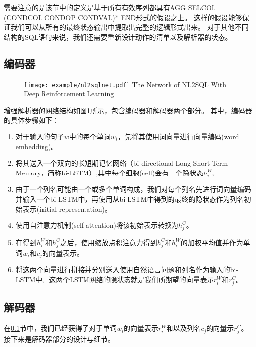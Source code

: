 需要注意的是该节中的定义是基于所有有效序列都具有AGG  SELCOL  (CONDCOL  CONDOP  CONDVAL)* END形式的假设之上。
这样的假设能够保证我们可以从所有的最终状态输出中提取出完整的逻辑形式出来。
对于其他不同结构的SQL语句来说，我们还需要重新设计动作的清单以及解析器的状态。


\subsection{编码器}
\label{enl2sql:encoder}

\begin{figure}[!htp]
  \centering
  \texttt{[image: example/nl2sqlnet.pdf]}
    {The Network of NL2SQL With Deep Reinforcement Learning}
  \label{fig:nl2sqlnet}
\end{figure}


增强解析器的网络结构如图\ref{fig:nl2sqlnet}所示，包含编码器和解码器两个部分。
其中，编码器的具体步骤如下：
\begin{enumerate}
  \item 对于输入的句子$w$中的每个单词$w_i$，先将其使用词向量进行向量编码(word embedding)。
  \item 将其送入一个双向的长短期记忆网络（bi-directional Long Short-Term Memory，简称bi-LSTM）,其中每个细胞(cell)会有一个隐状态$h^W_i$。
  \item 由于一个列名可能由一个或多个单词构成，我们对每个列名先进行词向量编码并输入一个bi-LSTM中，再使用从bi-LSTM中得到的最终的隐状态作为列名初始表示(initial representation)。
  \item 使用自注意力机制(self-attention\cite{vaswani2017attention})将该初始表示转换为$h^C_j$。
  \item 在得到$h^W_i$和$h^C_j$之后，使用缩放点积注意力\cite{vaswani2017attention}得到$h^C_j$和$h^W_i$的加权平均值并作为单词$w_i$和$c_j$的向量表示。
  \item 将这两个向量进行拼接并分别送入使用自然语言问题和列名作为输入的bi-LSTM中。这两个LSTM网络的隐状态就是我们所期望的向量表示$r^W_i$和$r^C_j$。
\end{enumerate}


\subsection{解码器}
\label{enl2sql:decoder}

在\ref{enl2sql:encoder}节中，我们已经获得了对于单词$w_i$的向量表示$r^W_i$和以及列名$c_j$的向量示$r^C_j$。
接下来是解码器部分的设计与细节。

